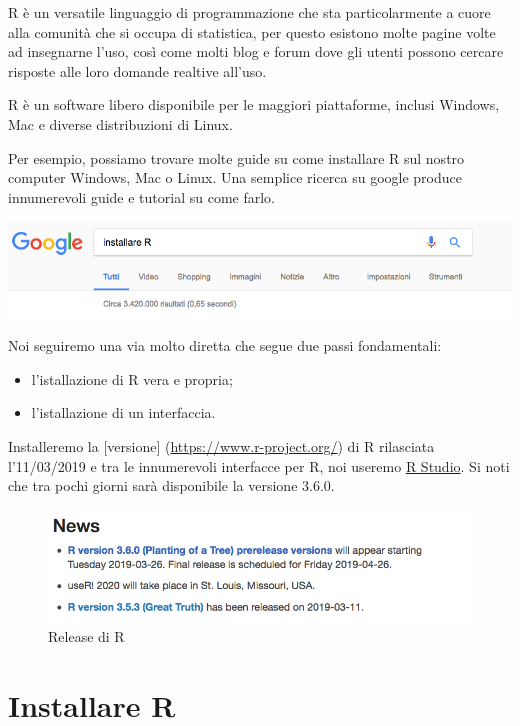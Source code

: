 \documentclass[]{book}
\providecommand{\tightlist}{%
  \setlength{\itemsep}{0pt}\setlength{\parskip}{0pt}}
\begin{document}
R è un versatile linguaggio di programmazione che sta particolarmente a cuore alla comunità che si occupa di statistica, per questo esistono molte pagine volte ad insegnarne l'uso, così come molti blog e forum dove gli utenti possono cercare risposte alle loro domande realtive all'uso.

R è un software libero disponibile per le maggiori piattaforme, inclusi Windows, Mac e diverse distribuzioni di Linux.

Per esempio, possiamo trovare molte guide su come installare R sul nostro computer Windows, Mac o Linux. Una semplice ricerca su google produce innumerevoli guide e tutorial su come farlo.

\includegraphics{./media/Google_Install_R.png}

Noi seguiremo una via molto diretta che segue due passi fondamentali:

\begin{itemize}
\tightlist
\item
  l'istallazione di R vera e propria;
\item
  l'istallazione di un interfaccia.
\end{itemize}

Installeremo la {[}versione{]} (\url{https://www.r-project.org/}) di R rilasciata l'11/03/2019 e tra le innumerevoli interfacce per R, noi useremo \href{https://www.rstudio.com/products/rstudio/}{R Studio}. Si noti che tra pochi giorni sarà disponibile la versione 3.6.0.

\begin{figure}
\centering
\includegraphics{./media/R_release_2019.png}
\caption{Release di R}
\end{figure}

\hypertarget{installare-r}{%
\section{Installare R}\label{installare-r}}
\end{document}
